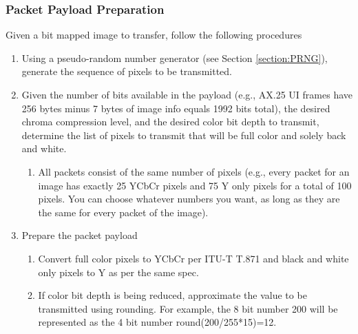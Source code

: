 \documentclass[letterpaper]{article}
\begin{document}
\subsubsection{Packet Payload Preparation}

Given a bit mapped image to transfer, follow the following procedures

\begin{enumerate}
    \item Using a pseudo-random number generator (see Section \ref{section:PRNG}), generate the sequence of pixels to be transmitted.
    \item Given the number of bits available in the payload (e.g., AX.25 UI frames have 256 bytes minus 7 bytes of image info equals 1992 bits total), the desired chroma compression level, and the desired color bit depth to transmit, determine the list of pixels to transmit that will be full color and solely back and white.
    \begin{enumerate}
        \item All packets consist of the same number of pixels (e.g., every packet for an image has exactly 25 YCbCr pixels and 75 Y only pixels for a total of 100 pixels. You can choose whatever numbers you want, as long as they are the same for every packet of the image).
    \end{enumerate}
    \item Prepare the packet payload
    \begin{enumerate}
        \item Convert full color pixels to YCbCr per ITU-T T.871 \cite{jpeg} and black and white only pixels to Y as per the same spec.
        \item If color bit depth is being reduced, approximate the value to be transmitted using rounding. For example, the 8 bit number 200 will be represented as the 4 bit number round(200/255*15)=12.
    \end{enumerate}
\end{enumerate}
\end{document}
